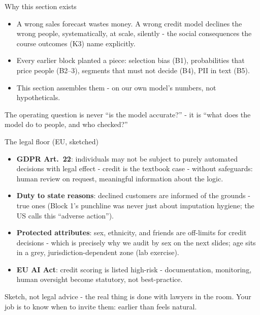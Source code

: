 \documentclass[10pt,aspectratio=169]{beamer}
\begin{document}
\begin{frame}{Why this section exists}
  \begin{itemize}
    \item A wrong sales forecast wastes money. A wrong \alert{credit
          model} declines the wrong people, systematically, at scale,
          silently - the social consequences the course outcomes
          (K3) name explicitly.
    \item Every earlier block planted a piece: selection bias (B1),
          probabilities that price people (B2--3), segments that must not
          decide (B4), PII in text (B5).
    \item This section assembles them - on \alert{our own model's
          numbers}, not hypotheticals.
  \end{itemize}
  \vspace{0.5em}
  \begin{center}
    The operating question is never ``is the model accurate?'' -
    it is \alert{``what does the model do to people, and who checked?''}
  \end{center}
\end{frame}

\begin{frame}{The legal floor (EU, sketched)}
  \begin{itemize}
    \item \textbf{GDPR Art.\ 22}: individuals may not be subject to purely
          automated decisions with legal effect - credit is the textbook
          case - without safeguards: \alert{human review on request,
          meaningful information about the logic}.
    \item \textbf{Duty to state reasons}: declined customers are informed
          of the grounds - true ones (Block 1's punchline was never just
          about imputation hygiene; the US calls this ``adverse action'').
    \item \textbf{Protected attributes}: sex, ethnicity, and friends
          are off-limits for credit decisions - which is precisely why we
          audit \alert{by sex} on the next slides; age sits in a grey,
          jurisdiction-dependent zone (lab exercise).
    \item \textbf{EU AI Act}: credit scoring is listed \alert{high-risk}
          - documentation, monitoring, human oversight become statutory,
          not best-practice.
  \end{itemize}
  \vspace{0.3em}
  \begin{center}\small
    Sketch, not legal advice - the real thing is done \alert{with
    lawyers in the room}. Your job is to know when to invite them: earlier
    than feels natural.
  \end{center}
\end{frame}
\end{document}

